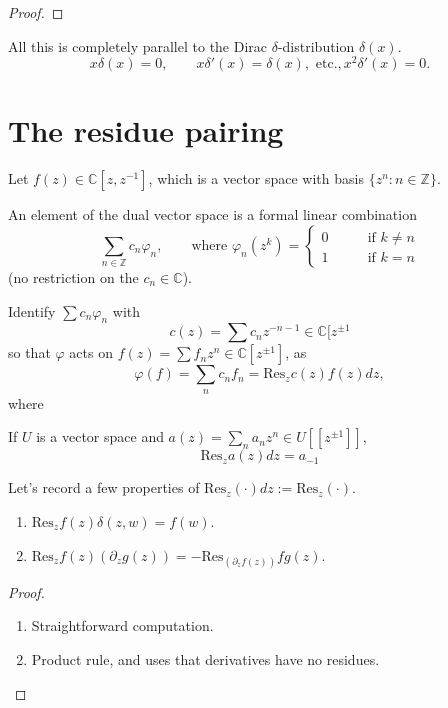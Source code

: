 \begin{proof}

\end{proof}

\begin{remark}
\label{remark-like-usual-Dirac-delta}
All this is completely parallel
to the Dirac $\delta$-distribution $\delta(x)$.
$$
x\delta(x)=0,\qquad x\delta'(x)=\delta(x),\text{ etc.}, x^2\delta'(x)=0.
$$
\end{remark}

\section{The residue pairing}
\label{section-residue-pairing}

Let $f(z) \in \mathbb{C}[z,z^{-1}]$, which is a vector space
with basis $\{z^n:n\in\mathbb{Z}\}$.

An element of the dual vector space is a formal linear combination
$$
\sum_{n \in \mathbb{Z}}c_n\varphi_n,\qquad \text{where }
\varphi_n(z^k)=\begin{cases}
0\qquad &\text{if }k \neq n \\
1\qquad &\text{if }k=n
\end{cases}
$$
(no restriction on the $c_n \in \mathbb{C}$).

Identify $\sum c_n \varphi_n$ with 
$$
c(z)=\sum c_nz^{-n-1}\in \mathbb{C}[z^{\pm 1}
$$
so that $\varphi$ acts on $f(z)=\sum f_nz^n \in \mathbb{C}[z^{\pm 1}]$,
as 
$$
\varphi(f)=\sum_{n}c_nf_n=\text{Res}_zc(z)f(z)dz,
$$
where
\begin{definition}
\label{definition-residue}
If  $U$ is a vector space and $a(z)=\sum_{n}a_nz^n \in U[\![z^{\pm 1}]\!]$,
$$
\text{Res}_za(z)dz=a_{-1}
$$
\end{definition}

Let's record a few properties of $\text{Res}_z(\cdot)dz:=\text{Res}_z(\cdot)$.

\begin{lemma}
\label{lemma-properties-of-residues}
\begin{enumerate}
\item $\text{Res}_zf(z)\delta(z,w)=f(w)$.
\item $\text{Res}_zf(z)(\partial_zg(z))=-\text{Res}_(\partial_zf(z))fg(z)$.
\end{enumerate}
\end{lemma}

\begin{proof}
\begin{enumerate}
\item Straightforward computation.
\item Product rule, and uses that derivatives have no residues.
\end{enumerate}
\end{proof}

